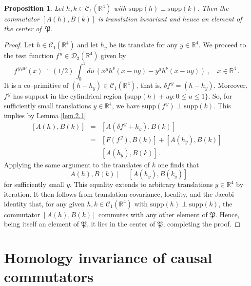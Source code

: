 \documentclass[11pt]{article}
\newtheorem{proposition}[theorem]{Proposition}
\numberwithin{equation}{section}
\newcommand{\RR}{{\mathbb R}}
\newcommand{\Cc}{{\mathcal{C}}}
\newcommand{\Dc}{{\mathcal{D}}}
\newcommand{\fP}{{\mathfrak P}}
\newcommand{\supp}{{\mathrm{supp}}}
\begin{document}
\begin{proposition}
\label{prop.2.2}
Let $h,k \in \Cc_1(\RR^4)$  with $\supp(h) \perp \supp(k)$. 
Then the com\-mutator $[ A(h) , B(k) ]$ is translation invariant 
and hence an element of the center of~$\fP$. 
\end{proposition}
\begin{proof}
Let $h \in \Cc_1(\RR^4)$ and let $h_y$ be its 
translate for any $y \in \RR^4$. We proceed to the test function
$f^{\, y} \in \Dc_2(\RR^4)$ given by 
$$
f^{\, y \, \mu \nu}(x)   
\doteq (1/2)\,\int_0^1 \! du \, (x^{\mu} h^{\nu}(x - uy) 
- y^{\mu} h^{\nu}(x - u y)) \ , \quad x\in\RR^4 \, . 
$$
It is a co--primitive of $(h - h_y) \in \Cc_1(\RR^4)$, that is,
%
$\delta f^{\, y} = (h - h_y)$.
%
Moreover, $f^{\, y}$ has support in the cylindrical region 
$\{ \supp(h) + u y : 0 \leq u \leq 1 \}$. So, for sufficiently small
translations $y \in \RR^4$, we have $\supp(f^{\, y}) \perp \supp(k)$.
This implies by Lemma \ref{lem.2.1} 
$$
\begin{array}{lcl}
[A(h), B(k)] & = & [A(\delta f^{\, y} +h_y), B(k)] \\ & = &  
[F(f^{\, y}), B(k)] + [A(h_y), B(k)] \\ & = &
[A(h_y), B(k)] \, . 
\end{array}
$$
Applying the same argument to the
translates of $k$ one finds that 
$$
[A(h), B(k)] = [A(h_{y}), B(k_{y})]
$$
for sufficiently small $y$. This equality extends to arbitrary translations 
$y \in \RR^4$ by iteration. 
It then follows from translation covariance, locality, 
and the Jacobi identity that,
for any given $h, k \in \Cc_1(\RR^4)$ 
with $\supp(h) \perp \supp(k)$,
the commutator $[A(h), B(k)]$ commutes with any other element of $\fP$.
Hence, being itself an element of $\fP$,
it lies in the center of $\fP$, completing the proof.
\end{proof}

\section{Homology invariance of causal commutators}
\label{sec3}
\end{document}
